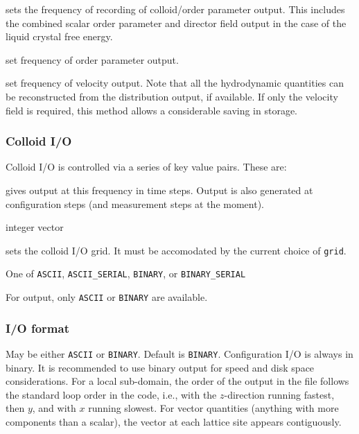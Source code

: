 sets the frequency of recording of colloid/order parameter output.
This includes the combined scalar order parameter and director
field output in the case of the liquid crystal free energy.


set frequency of order parameter output.


set frequency of velocity output. Note that all the hydrodynamic
quantities can be reconstructed from the distribution output, if
available. If only the velocity field is required, this method
allows a considerable saving in storage.

\subsubsection{Colloid I/O}

Colloid I/O is controlled via a series of key value pairs. These are:


gives output at this frequency in time steps. Output is also generated
at configuration steps (and measurement steps at the moment).

 integer vector

sets the colloid I/O grid. It must be accomodated by the current
choice of \texttt{grid}.


One of \texttt{ASCII}, \texttt{ASCII\_SERIAL}, \texttt{BINARY}, or
\texttt{BINARY\_SERIAL}


For output, only \texttt{ASCII} or \texttt{BINARY} are available.
 

\subsubsection{I/O format}




May be either \texttt{ASCII} or \texttt{BINARY}. Default is \texttt{BINARY}.
Configuration I/O is always in binary. It is recommended to use
binary output for speed and disk space considerations. For a local
sub-domain, the order of the output in the file follows the standard
loop order in the code, i.e., with the $z$-direction running fastest,
then $y$, and with $x$ running slowest. For vector quantities
(anything with more components than a scalar), the vector at each
lattice site appears contiguously.

